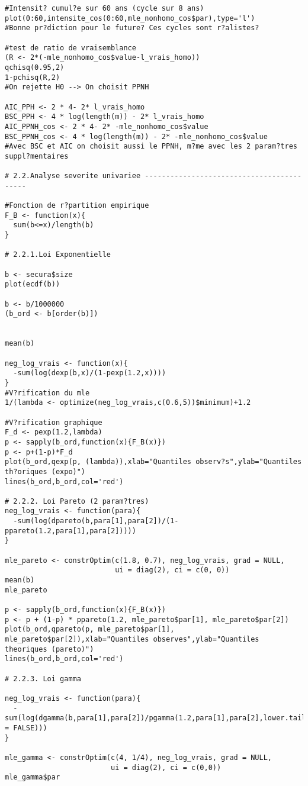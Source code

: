 \begin{verbatim}
#Intensit? cumul?e sur 60 ans (cycle sur 8 ans)
plot(0:60,intensite_cos(0:60,mle_nonhomo_cos$par),type='l') 
#Bonne pr?diction pour le future? Ces cycles sont r?alistes?

#test de ratio de vraisemblance
(R <- 2*(-mle_nonhomo_cos$value-l_vrais_homo))
qchisq(0.95,2)
1-pchisq(R,2)
#On rejette H0 --> On choisit PPNH

AIC_PPH <- 2 * 4- 2* l_vrais_homo
BSC_PPH <- 4 * log(length(m)) - 2* l_vrais_homo
AIC_PPNH_cos <- 2 * 4- 2* -mle_nonhomo_cos$value
BSC_PPNH_cos <- 4 * log(length(m)) - 2* -mle_nonhomo_cos$value
#Avec BSC et AIC on choisit aussi le PPNH, m?me avec les 2 param?tres suppl?mentaires 

# 2.2.Analyse severite univariee ------------------------------------------

#Fonction de r?partition empirique
F_B <- function(x){
  sum(b<=x)/length(b)
}

# 2.2.1.Loi Exponentielle

b <- secura$size
plot(ecdf(b))

b <- b/1000000
(b_ord <- b[order(b)])


mean(b)

neg_log_vrais <- function(x){
  -sum(log(dexp(b,x)/(1-pexp(1.2,x))))
}
#V?rification du mle
1/(lambda <- optimize(neg_log_vrais,c(0.6,5))$minimum)+1.2

#V?rification graphique
F_d <- pexp(1.2,lambda)
p <- sapply(b_ord,function(x){F_B(x)})
p <- p+(1-p)*F_d
plot(b_ord,qexp(p, (lambda)),xlab="Quantiles observ?s",ylab="Quantiles th?oriques (expo)")
lines(b_ord,b_ord,col='red')

# 2.2.2. Loi Pareto (2 param?tres)
neg_log_vrais <- function(para){
  -sum(log(dpareto(b,para[1],para[2])/(1-ppareto(1.2,para[1],para[2]))))
}

mle_pareto <- constrOptim(c(1.8, 0.7), neg_log_vrais, grad = NULL, 
                          ui = diag(2), ci = c(0, 0))
mean(b)
mle_pareto

p <- sapply(b_ord,function(x){F_B(x)})
p <- p + (1-p) * ppareto(1.2, mle_pareto$par[1], mle_pareto$par[2])
plot(b_ord,qpareto(p, mle_pareto$par[1], mle_pareto$par[2]),xlab="Quantiles observes",ylab="Quantiles theoriques (pareto)")
lines(b_ord,b_ord,col='red')

# 2.2.3. Loi gamma

neg_log_vrais <- function(para){
  -sum(log(dgamma(b,para[1],para[2])/pgamma(1.2,para[1],para[2],lower.tail = FALSE)))
}

mle_gamma <- constrOptim(c(4, 1/4), neg_log_vrais, grad = NULL, 
                         ui = diag(2), ci = c(0,0))
mle_gamma$par


\end{verbatim}
